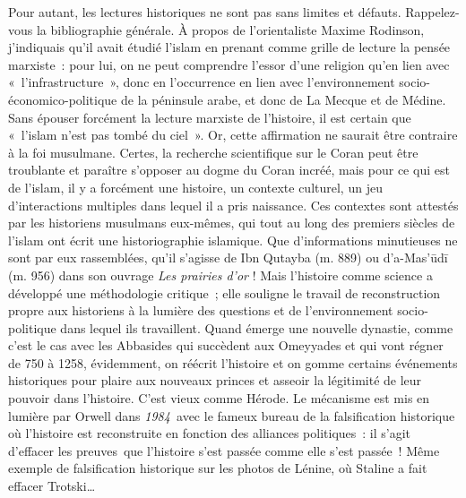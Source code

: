 Pour autant, les lectures historiques ne sont pas sans limites et
défauts. Rappelez-vous la bibliographie générale. À propos de
l'orientaliste Maxime Rodinson, j'indiquais qu'il avait étudié l'islam
en prenant comme grille de lecture la pensée marxiste~: pour lui, on ne
peut comprendre l'essor d'une religion qu'en lien avec
«~l'infrastructure~», donc en l'occurrence en lien avec l'environnement
socio-économico-politique de la péninsule arabe, et donc de La Mecque et
de Médine. Sans épouser forcément la lecture marxiste de l'histoire, il
est certain que «~l'islam n'est pas tombé du ciel~». Or, cette
affirmation ne saurait être contraire à la foi musulmane. Certes, la
recherche scientifique sur le Coran peut être troublante et paraître
s'opposer au dogme du Coran incréé, mais pour ce qui est de l'islam, il
y a forcément une histoire, un contexte culturel, un jeu d'interactions
multiples dans lequel il a pris naissance. Ces contextes sont attestés
par les historiens musulmans eux-mêmes, qui tout au long des premiers
siècles de l'islam ont écrit une historiographie islamique. Que
d'informations minutieuses ne sont par eux rassemblées, qu'il s'agisse
de Ibn Qutayba (m. 889) ou d'a-Mas'ūdī (m. 956) dans son ouvrage \emph{Les
prairies d'or} ! Mais l'histoire comme science a développé une
méthodologie critique~; elle souligne le travail de reconstruction
propre aux historiens à la lumière des questions et de l'environnement
socio-politique dans lequel ils travaillent. Quand émerge une nouvelle
dynastie, comme c'est le cas avec les Abbasides qui succèdent aux
Omeyyades et qui vont régner de 750 à 1258, évidemment, on réécrit
l'histoire et on gomme certains événements historiques pour plaire aux
nouveaux princes et asseoir la légitimité de leur pouvoir dans
l'histoire. C'est vieux comme Hérode. Le mécanisme est mis en lumière
par Orwell dans \emph{1984~}avec le fameux bureau de la falsification
historique où l'histoire est reconstruite en fonction des alliances
politiques~: il s'agit d'effacer les preuves~que l'histoire s'est passée
comme elle s'est passée~! Même exemple de falsification historique sur
les photos de Lénine, où Staline a fait effacer Trotski\ldots{} 



